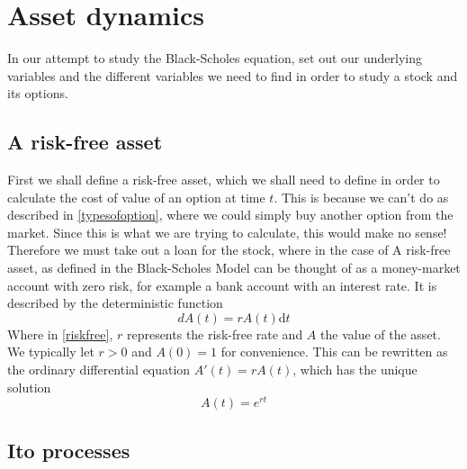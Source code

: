 \documentclass[11pt]{article} %
\begin{document}
\section{Asset dynamics}\label{assetdyamics}
In our attempt to study the Black-Scholes equation, set out our underlying variables 
and the different variables we need to find in order to study a stock and its options.

\subsection{A risk-free asset}
First we shall define a risk-free asset, which we shall need to define in order to 
calculate the cost of value of an option at time $t$. This is because we can't do 
as described in \ref{typesofoption}, where we could simply buy another option from the 
market. Since this is what we are trying to calculate, this would make no sense! Therefore 
we must take out a loan for the stock, where in the case of 
A risk-free asset, as defined in the Black-Scholes Model \cite{blackscholes} can be thought
of as a money-market account with zero risk, for example a bank account with an interest 
rate. It is described by the deterministic function 
\begin{equation} \label{riskfree}
    dA(t) = rA(t)\mathrm{d}t 
\end{equation}
Where in \eqref{riskfree}, $r$ represents the risk-free rate and $A$ the value of the 
asset. We typically let $r>0$ and $A(0) = 1$ for convenience. This can be rewritten as 
the ordinary differential equation $A'(t) = rA(t)$, which has the unique solution 
\begin{equation} \label{riskfree solution}
    A(t) =e^{rt}
\end{equation}
\subsection{Ito processes}
\end{document}
